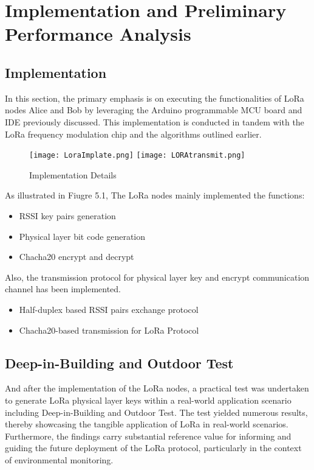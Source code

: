 
\chapter{Implementation and Preliminary Performance Analysis}

\section{Implementation}
In this section, the primary emphasis is on executing the functionalities of LoRa nodes Alice and Bob by leveraging the Arduino programmable MCU board and IDE previously discussed. This implementation is conducted in tandem with the LoRa frequency modulation chip and the algorithms outlined earlier.

\begin{figure}
  \centering
  {\texttt{[image: LoraImplate.png]}}
  {\texttt{[image: LORAtransmit.png]}}
  \caption{Implementation Details}\label{Implementation Details}
\end{figure}

As illustrated in Fiugre 5.1, The LoRa nodes mainly implemented the functions: 
\begin{itemize}
  \item RSSI key pairs generation 
  \item Physical layer bit code generation
  \item Chacha20 encrypt and decrypt
\end{itemize}

Also, the transmission protocol for physical layer key and encrypt communication channel has been implemented.
\begin{itemize}
  \item Half-duplex based RSSI pairs exchange protocol  
  \item Chacha20-based transmission for LoRa Protocol
\end{itemize}


\section{Deep-in-Building and Outdoor Test}
And after the implementation of the LoRa nodes, a practical test was undertaken to generate LoRa physical layer keys within a real-world application scenario including Deep-in-Building and Outdoor Test. The test yielded numerous results, thereby showcasing the tangible application of LoRa in real-world scenarios. Furthermore, the findings carry substantial reference value for informing and guiding the future deployment of the LoRa protocol, particularly in the context of environmental monitoring.

